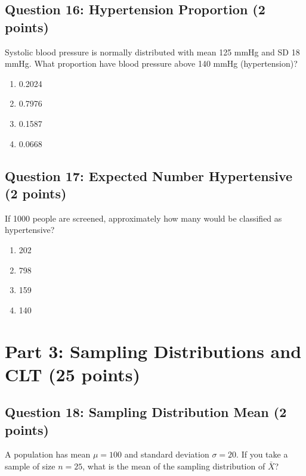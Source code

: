 \documentclass[11pt]{article}
\begin{document}
\vspace{0.5cm}

\subsection*{Question 16: Hypertension Proportion (2 points)}

Systolic blood pressure is normally distributed with mean 125 mmHg and SD 18 mmHg. What proportion have blood pressure above 140 mmHg (hypertension)?

\begin{enumerate}[label=\Alph*)]
\item 0.2024
\item 0.7976
\item 0.1587
\item 0.0668
\end{enumerate}

\vspace{0.5cm}

\subsection*{Question 17: Expected Number Hypertensive (2 points)}

If 1000 people are screened, approximately how many would be classified as hypertensive?

\begin{enumerate}[label=\Alph*)]
\item 202
\item 798
\item 159
\item 140
\end{enumerate}

\vspace{0.5cm}

\newpage

\section{Part 3: Sampling Distributions and CLT (25 points)}

\subsection*{Question 18: Sampling Distribution Mean (2 points)}

A population has mean $\mu = 100$ and standard deviation $\sigma = 20$. If you take a sample of size $n=25$, what is the mean of the sampling distribution of $\bar{X}$?
\end{document}
